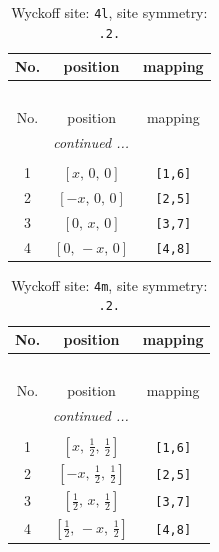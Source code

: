 \documentclass[fleqn,8pt]{jsarticle}
\begin{document}
\renewcommand{\arraystretch}{1.2}
\begin{longtable}{ccc}
\caption{Wyckoff site: {\tt 4l}, site symmetry: {\tt .2.}}
 \\
 \hline \hline
No. & position & mapping \\ \hline \endfirsthead

\multicolumn{2}{l}{\tablename\ \thetable{}} \\
 \hline \hline
No. & position & mapping \\ \hline \endhead

 \hline \hline
\multicolumn{2}{r}{\footnotesize\it continued ...} \\ \endfoot

 \hline \hline
\multicolumn{2}{r}{} \\ \endlastfoot

1 & $\left[ x,\, 0,\, 0 \right]$ & {\tt [1,6]} \\ \hline
2 & $\left[ - x,\, 0,\, 0 \right]$ & {\tt [2,5]} \\ \hline
3 & $\left[ 0,\, x,\, 0 \right]$ & {\tt [3,7]} \\ \hline
4 & $\left[ 0,\, - x,\, 0 \right]$ & {\tt [4,8]} \\
\end{longtable}
\renewcommand{\arraystretch}{1.2}
\begin{longtable}{ccc}
\caption{Wyckoff site: {\tt 4m}, site symmetry: {\tt .2.}}
 \\
 \hline \hline
No. & position & mapping \\ \hline \endfirsthead

\multicolumn{2}{l}{\tablename\ \thetable{}} \\
 \hline \hline
No. & position & mapping \\ \hline \endhead

 \hline \hline
\multicolumn{2}{r}{\footnotesize\it continued ...} \\ \endfoot

 \hline \hline
\multicolumn{2}{r}{} \\ \endlastfoot

1 & $\left[ x,\, \frac{1}{2},\, \frac{1}{2} \right]$ & {\tt [1,6]} \\ \hline
2 & $\left[ - x,\, \frac{1}{2},\, \frac{1}{2} \right]$ & {\tt [2,5]} \\ \hline
3 & $\left[ \frac{1}{2},\, x,\, \frac{1}{2} \right]$ & {\tt [3,7]} \\ \hline
4 & $\left[ \frac{1}{2},\, - x,\, \frac{1}{2} \right]$ & {\tt [4,8]} \\
\end{longtable}
\end{document}
